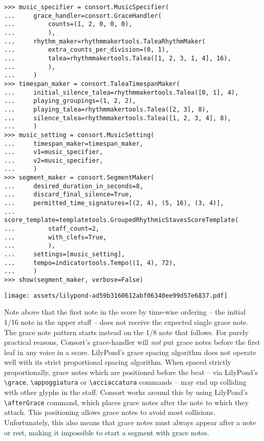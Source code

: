 \begin{abjadbookoutput}
\begin{singlespacing}
\vspace{-0.5\baselineskip}
\begin{verbatim}
>>> music_specifier = consort.MusicSpecifier(
...     grace_handler=consort.GraceHandler(
...         counts=(1, 2, 0, 0, 0),
...         ),
...     rhythm_maker=rhythmmakertools.TaleaRhythmMaker(
...         extra_counts_per_division=(0, 1),
...         talea=rhythmmakertools.Talea([1, 2, 3, 1, 4], 16),
...         ),
...     )
>>> timespan_maker = consort.TaleaTimespanMaker(
...     initial_silence_talea=rhythmmakertools.Talea([0, 1], 4),
...     playing_groupings=(1, 2, 2),
...     playing_talea=rhythmmakertools.Talea([2, 3], 8),
...     silence_talea=rhythmmakertools.Talea([1, 2, 3, 4], 8),
...     )
>>> music_setting = consort.MusicSetting(
...     timespan_maker=timespan_maker,
...     v1=music_specifier,
...     v2=music_specifier,
...     )
>>> segment_maker = consort.SegmentMaker(
...     desired_duration_in_seconds=8,
...     discard_final_silence=True,
...     permitted_time_signatures=[(2, 4), (5, 16), (3, 4)],
...     score_template=templatetools.GroupedRhythmicStavesScoreTemplate(
...         staff_count=2,
...         with_clefs=True,
...         ),
...     settings=[music_setting],
...     tempo=indicatortools.Tempo((1, 4), 72),
...     )
>>> show(segment_maker, verbose=False)
\end{verbatim}
\noindent\texttt{[image: assets/lilypond-ad59b3160612abf06340ee99d57e6837.pdf]}
\end{singlespacing}
\end{abjadbookoutput}

\noindent Note above that the first note in the score by time-wise ordering --
the initial 1/16 note in the upper staff -- does not receive the expected
single grace note. The grace note pattern starts instead on the 1/8 note that
follows. For purely practical reasons, Consort's grace-handler will \emph{not}
put grace notes before the first leaf in any voice in a score. LilyPond's grace
spacing algorithm does not operate well with its strict proportional spacing
algorithm. When spaced strictly proportionally, grace notes which are
positioned before the beat -- via LilyPond's \texttt{\textbackslash{}grace},
\texttt{\textbackslash{}appoggiatura} or \texttt{\textbackslash{}acciaccatura}
commands -- may end up colliding with other glyphs in the staff. Consort works
around this by using LilyPond's \texttt{\textbackslash{}afterGrace} command,
which places grace notes after the note to which they attach. This positioning
allows grace notes to avoid most collisions. Unfortunately, this also means
that grace notes must always appear after a note or rest, making it impossible
to start a segment with grace notes.

